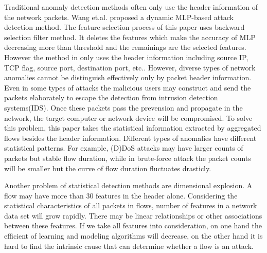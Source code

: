 \documentclass[journal]{IEEEtran}
\begin{document}
Traditional anomaly detection methods often only use the header information of the network packets. Wang et.al. \cite{Wang2020CS} proposed a dynamic MLP-based attack detection method. The feature selection process of this paper uses backward selection filter method. It deletes the features which make the accuracy of MLP decreasing more than threshold and the remainings are the selected features. However the method in \cite{Wang2020CS} only uses the header information including source IP, TCP flag, source port, destination port, etc..  %
However, diverse types of network anomalies cannot be distinguish effectively only by packet header information. Even in some types of attacks the malicious users may construct and send the packets elaborately to escape the detection from intrusion detection systems(IDS). Once these packets pass the prevension and propagate in the network, the target computer or network device will be compromised.
To solve this problem, this paper takes the statistical information extracted by aggregated flows besides the header information. Different types of anomalies have different statistical patterns. For example, (D)DoS attacks may have larger counts of packets but stable flow duration, while in brute-force attack the packet counts will be smaller but the curve of flow duration fluctuates drasticly. 

Another problem of statistical detection methods are dimensional explosion. A flow may have more than 30 features in the header alone. Considering the statistical characteristics of all packets in flows, number of features in a network data set will grow rapidly. There may be linear relationships or other associations between these features. If we take all features into consideration, on one hand the efficient of learning and modeling algorithms will decrease, on the other hand it is hard to find the intrinsic cause that can determine whether a flow is an attack.
\end{document}
